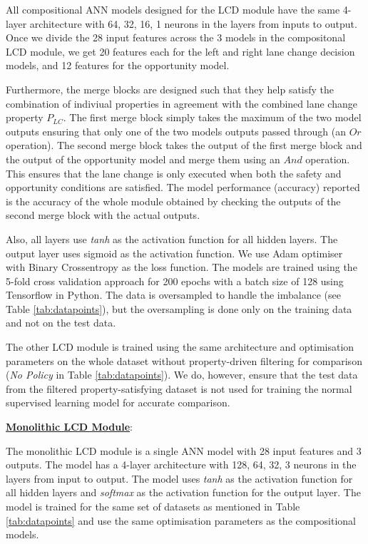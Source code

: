 All compositional ANN models designed for the LCD module have the same 4-layer architecture with 64, 32, 16, 1 neurons in the layers from inputs to output. Once we divide the 28 input features across the 3 models in the compositonal LCD module, we get 20 features each for the left and right lane change decision models, and 12 features for the opportunity model. 

Furthermore, the merge blocks are designed such that they help satisfy the combination of indiviual properties in agreement with the combined lane change property $P_{LC}$. The first merge block simply takes the maximum of the two model outputs ensuring that only one of the two models outputs passed through (an $Or$ operation). The second merge block takes the output of the first merge block and the output of the opportunity model and merge them using an $And$ operation. This ensures that the lane change is only executed when both the safety and opportunity conditions are satisfied. The model performance (accuracy) reported is the accuracy of the whole module obtained by checking the outputs of the second merge block with the actual outputs. 

Also, all layers use \emph{tanh} as the activation function for all hidden layers. The output layer uses sigmoid as the activation function. We use Adam optimiser with Binary Crossentropy as the loss function. The models are trained using the 5-fold cross validation approach for 200 epochs with a batch size of 128 using Tensorflow in Python. The data is oversampled to handle the imbalance (see Table \ref{tab:datapoints}), but the oversampling is done only on the training data and not on the test data. 

The other LCD module is trained using the same architecture and optimisation parameters on the whole dataset without property-driven filtering for comparison (\emph{No Policy} in Table \ref{tab:datapoints}). We do, however, ensure that the test data from the filtered property-satisfying dataset is not used for training the normal supervised learning model for accurate comparison.



\textbf{\underline{Monolithic LCD Module}}:

The monolithic LCD module is a single ANN model with 28 input features and 3 outputs. The model has a 4-layer architecture with 128, 64, 32, 3 neurons in the layers from input to output. The model uses \emph{tanh} as the activation function for all hidden layers and \emph{softmax} as the activation function for the output layer. The model is trained for the same set of datasets as mentioned in Table \ref{tab:datapoints} and use the same optimisation parameters as the compositional models. 



